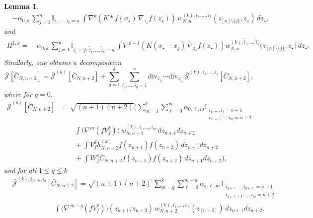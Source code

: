 \documentclass[pdflatex,sn-mathphys-num]{sn-jnl}
\theoremstyle{thmstyleone}%
\theoremstyle{thmstyletwo}%
\theoremstyle{thmstylethree}%
\newtheorem{lemma}{Lemma}
\begin{document}
\begin{lemma}
\[\begin{split}
& -\alpha_{0,k}\,\sum_{j=1}^n \mathbb{I}_{i_1,\ldots,i_k=n}\,\int \nabla^k(K * f(x_\star)\,\nabla_{z_\star} f(z_\star))\,w^{(k),i_1,...,i_k}_{N,n}(z_{[n]\setminus\{j\}}, z_\star)\,dz_\star,
\end{split}\]
and
\[
\begin{aligned}
H^{1,k} =\;&
\alpha_{0,k}\,\sum_{j=1}^n \mathbb{I}_{i_1=j;\;\tilde i_1,\ldots,\tilde i_k=n}\,\int
\nabla^{k-1}\!\left(
K(x_\star-x_j)\,
\nabla_{z_\star} f(z_\star)
\right)
w^{(k),\tilde i_1,\ldots,\tilde i_k}_{N,n}
\big(z_{[n]\setminus\{j\}},z_\star\big)\,
dz_\star.
\\
\end{aligned}
\]
Similarly, one obtains a decomposition
\begin{equation}\label{J_decomposition2}
\bar{\mathcal J}[\bar C_{N,n+2}]
= \bar{\mathcal J}^{(k)}[\bar C_{N,n+2}]
+ \sum_{q=1}^k \sum_{i_1,\dots,i_q=1}^n
\mathrm{div}_{z_{i_1}}\cdots \mathrm{div}_{z_{i_q}}
\,\bar{\mathcal J}^{(k),i_1,\dots,i_q}[\bar C_{N,n+2}],
\end{equation}
where for \(q=0\), 
\[
\begin{aligned}
\bar{\mathcal J}^{(k)}[\bar C_{N,n+2}]
&= \sqrt{(n+1)(n+2)} \Bigg(
\sum_{m=1}^{k}\sum_{\ell=0}^{m}
\alpha_{0,\ell,m}\mathbb{I}_{\substack{
i_1,\ldots,i_\ell=n+1 \\
i_{\ell+1},\ldots,i_m=n+2
}}
\\
&\qquad 
\int
\bigl(\nabla^{m}(fV_f^\delta)\bigr)\,
w_{N,n+2}^{(k),i_1,\ldots,i_m}\,
dz_{n+1}dz_{n+2}
\\
&\qquad
+\int V_f^\delta h_{N,n+2}^{(k)}
f(z_{n+1})f(z_{n+2})\,
dz_{n+1}dz_{n+2}
\\
&\qquad
+\int W_f^\delta \bar C_{N,n+2}
f(z_{n+1})f(z_{n+2})\,
dz_{n+1}dz_{n+2}
\Bigg),
\end{aligned}
\]
and for all \(1 \leq q \leq k\) 
\[
\begin{aligned}
&\bar{\mathcal J}^{(k),i_1,\dots,i_q}[\bar C_{N,n+2}]
= \sqrt{(n+1)(n+2)} \,\sum_{m=q}^k\sum_{\ell=0}^{m-q} \alpha_{q,\ell,m}\,\mathbb{I}_{\substack{i_{q+1},\ldots, i_{q+\ell}=n+1 \\ i_{q+\ell+1},\ldots,i_m=n+2}}\\
&\qquad\qquad\qquad\int
\big(\nabla^{\,m-q}(fV_f^\delta)\big)(z_{n+1},z_{n+2})\,
w_{N,n+2}^{(k),i_1,\dots,i_m}(z_{[n+2]})\,
dz_{n+1}dz_{n+2}.
\end{aligned}
\]
\end{lemma}
\end{document}
